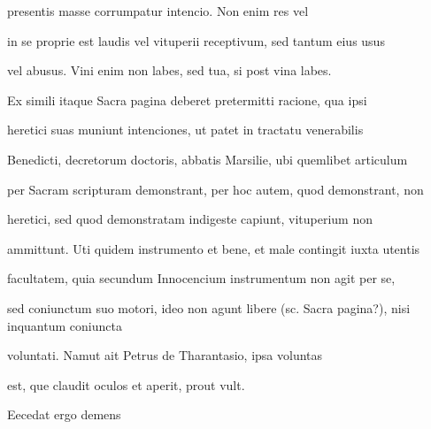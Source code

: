 \begin{VerbatimLatin}[firstnumber=37]
 presentis masse corrumpatur intencio. Non enim res vel 

 in se proprie est laudis vel vituperii receptivum, sed tantum eius usus

vel abusus. Vini enim non labes, sed tua, si post vina labes{\color{red}\footnotemark[26]}.

Ex simili itaque Sacra pagina deberet pretermitti racione, qua ipsi

heretici suas muniunt intenciones, ut patet in tractatu venerabilis

Benedicti, decretorum doctoris, abbatis Marsilie, ubi quemlibet articulum

per Sacram scripturam demonstrant, per hoc autem, quod demonstrant, non 

 heretici, sed quod demonstratam indigeste capiunt, vituperium non

ammittunt. Uti quidem instrumento et bene, et male contingit iuxta utentis

facultatem, quia secundum Innocencium instrumentum non agit per se,

sed coniunctum suo motori, ideo non agunt libere (sc. Sacra pagina?), nisi inquantum coniuncta 

 voluntati. Namut ait Petrus de Tharantasio, ipsa voluntas
\end{VerbatimLatin}


\renewcommand{\theFancyVerbLine}{\textcolor{green}{05-49\alph{FancyVerbLine}}}
\begin{VerbatimLatin}[firstnumber=1]
est, que claudit oculos et aperit, prout vult.

\indentK Eecedat ergo demens 
\end{VerbatimLatin}


